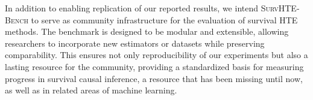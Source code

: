 In addition to enabling replication of our reported results, we intend \textsc{SurvHTE‐Bench} to serve as
community infrastructure for the evaluation of survival HTE methods.
The benchmark is designed
to be modular and extensible, allowing researchers to incorporate new estimators or datasets while
preserving comparability.
This ensures not only reproducibility of our experiments but also a lasting
resource for the community, providing a standardized basis for measuring progress in survival causal inference, a resource that has been missing until now, as well as in related areas of machine learning.






